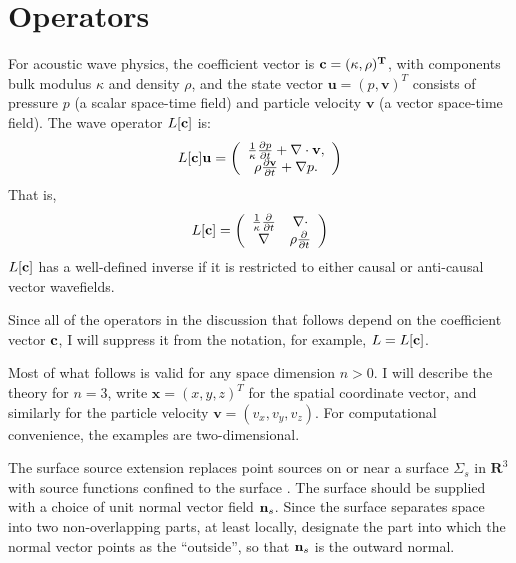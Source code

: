 \documentclass[georeport,12pt]{geophysics}
\newcommand{\bx}{\mathbf{x}}
\newcommand{\bv}{\mathbf{v}}
\newcommand{\bu}{\mathbf{u}}
\newcommand{\bR}{\mathbf{R}}
\begin{document}
\section{Operators}

For acoustic wave physics, the coefficient vector is
$\bf{c}=(\kappa,\rho)^T$, with components bulk modulus $\kappa$ and
density $\rho$, and the state vector $\bu=(p,\bv)^T$ consists of
pressure $p$ (a scalar space-time field) and particle velocity $\bv$
(a vector space-time field). The wave operator $L[\bf{c}]$ is:
\begin{equation}
\label{eqn:aweop}
L[\bf{c}]\bf{u} = 
\left(
\begin{array}{c}
\frac{1}{\kappa}\frac{\partial p}{\partial t}  + \nabla \cdot \bv, \\
\rho\frac{\partial \bv}{\partial t} + \nabla p.
\end{array}
\right) 
\end{equation}
That is,
\begin{equation}
  \label{eqn:awemat}
  L[{\bf c}] = \left(
    \begin{array}{cc}
      \frac{1}{\kappa}\frac{\partial}{\partial t} & \nabla \cdot \\
      \nabla & \rho \frac{\partial}{\partial t}
    \end{array}
  \right)
\end{equation}
$L[{\bf c}]$ has a well-defined inverse %
if it is restricted to either causal or anti-causal vector wavefields.

Since all of the operators in the discussion that follows depend on
the coefficient vector $\bf{c}$, I will suppress it from the notation,
for example, $L=L[\bf{c}]$.

Most of what follows is valid for any space dimension $n >0$. I will
describe the theory for $n=3$, write $\bx=(x,y,z)^T$ for the spatial
coordinate vector, and similarly for the 
particle velocity $\bv = (v_x,v_y,v_z)$. For computational convenience, the
examples are two-dimensional.

The surface source extension replaces point sources on or near a
surface $\Sigma_s$ in $\bR^3$ with source functions confined to the
surface . The surface should be supplied with a choice of unit normal
vector field ${\bf n}_s$. Since the surface separates space into two
non-overlapping parts, at least locally, designate the part into which
the normal vector points as the ``outside'', so that ${\bf n}_s$ is
the outward normal.
\end{document}
